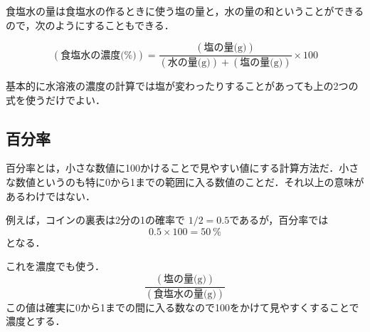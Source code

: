\documentclass[dvipdfmx,18pt]{jsarticle}
\begin{document}
    食塩水の量は食塩水の作るときに使う塩の量と，水の量の和ということができるので，次のようにすることもできる．

    \begin{equation}
        (\text{食塩水の濃度(\%)}) = \frac{(\text{塩の量(g)})}{(\text{水の量(g)})+(\text{塩の量(g)})}\times 100
    \end{equation}

    基本的に水溶液の濃度の計算では塩が変わったりすることがあっても上の2つの式を使うだけでよい．

    \subsection{百分率}
    百分率とは，小さな数値に100かけることで見やすい値にする計算方法だ．小さな数値というのも特に0から1までの範囲に入る数値のことだ．それ以上の意味があるわけではない．

    例えば，コインの裏表は2分の1の確率で \(1/2=0.5\)であるが，百分率では
    \[
    0.5\times 100 =50\ \%
    \]
    となる．

    これを濃度でも使う．
    \[
    \frac{(\text{塩の量(g)})}{(\text{食塩水の量(g)})}
    \]
    この値は確実に0から1までの間に入る数なので100をかけて見やすくすることで濃度とする．

    
\end{document}

